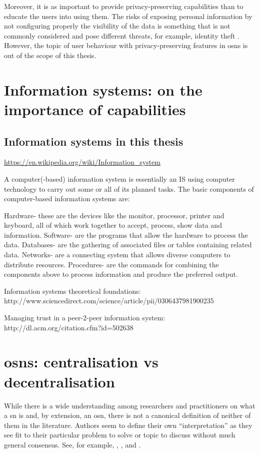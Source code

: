 \documentclass[showtrims,oldfontcommands]{kthesis}
\begin{document}
Moreover, it is as important to provide privacy-preserving capabilities than to 
educate the users into using them. The risks of exposing personal information by 
not configuring properly the visibility of the data is something that is not commonly 
considered and pose different threats, for example, identity theft \cite{GrossAH05, BrandtzaegLS10}. 
However, the topic of user behaviour with privacy-preserving features in \acp{osn} 
is out of the scope of this thesis.

\section{Information systems: on the importance of capabilities}

\subsection{Information systems in this thesis}
\url{https://en.wikipedia.org/wiki/Information_system}

A computer(-based) information system is essentially an IS using computer technology to carry out some or all of its planned tasks. The basic components of computer-based information systems are:

Hardware- these are the devices like the monitor, processor, printer and keyboard, all of which work together to accept, process, show data and information.
Software- are the programs that allow the hardware to process the data.
Databases- are the gathering of associated files or tables containing related data.
Networks- are a connecting system that allows diverse computers to distribute resources.
Procedures- are the commands for combining the components above to process information and produce the preferred output.

Information systems theoretical foundations: http://www.sciencedirect.com/science/article/pii/0306437981900235

Managing trust in a peer-2-peer information system: http://dl.acm.org/citation.cfm?id=502638


\section{\Aclp{osn}: centralisation vs decentralisation}
While there is a wide understanding among researchers and practitioners on what 
a \ac{sn} is and, by extension, an \ac{osn}, there is not a canonical definition 
of neither of them in the literature. Authors seem to define their own ``interpretation'' 
as they see fit to their particular problem to solve or topic to discuss without 
much general consensus. See, for example, \cite{AdamicA05}, \cite{DwyerHP07}, \cite{SchneiderFKW09} 
and \cite{RichterRB11}.
\end{document}
